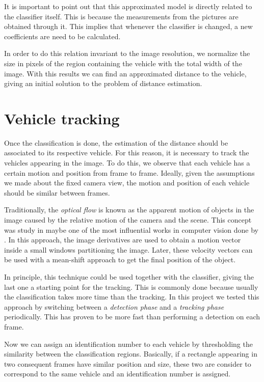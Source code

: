 It is important to point out that this approximated model is directly related to
the classifier itself. This is because the measurements from the pictures are
obtained through it. This implies that whenever the classifier is changed, a new
coefficients are need to be calculated.

In order to do this relation invariant to the image resolution, we normalize the
size in pixels of the region containing the vehicle with the total width of the
image. With this results we can find  an approximated distance to the
vehicle, giving an initial solution to the problem of distance estimation.


\section{Vehicle tracking} %
\label{sec:vehicle-tracking}

Once the classification is done, the estimation of the distance should be
associated to its respective vehicle. For this reason, it is necessary to track
the vehicles appearing in the image. To do this, we observe that each vehicle has 
a certain motion and position from frame to frame. Ideally, given the
assumptions we made about the fixed camera view, the motion and position of each
vehicle should be similar between frames.

Traditionally, the \textit{optical flow} is known as the apparent motion of
objects in the image caused by the relative motion of the camera and the scene.
This concept was study in maybe one of the most influential works in computer 
vision done by \cite{lucas-kanade}. In this approach, the image derivatives are
used to obtain a motion vector inside a small windows partitioning the image. 
Later, these velocity vectors can be used with a mean-shift approach to get 
the final position of the object.

In principle, this technique could be used together with the classifier, giving
the last one a starting point for the tracking. This is commonly done because
usually the classification takes more time than the tracking. In this project we
tested this approach by switching between a \textit{detection phase} and a
\textit{tracking phase} periodically. This has proven to be more fast than
performing a detection on each frame.

Now we can assign an identification number to each vehicle by
thresholding the similarity between the classification regions. Basically, if a 
rectangle appearing in two consequent frames have similar position and size, these
two are consider to correspond to the same vehicle and an identification number
is assigned. 

